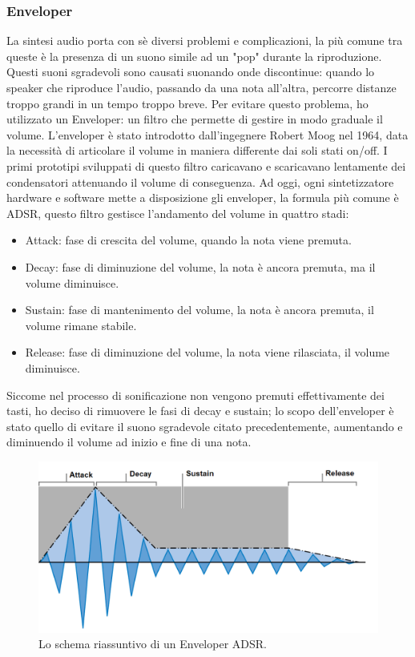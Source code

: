 \subsubsection{Enveloper}
La sintesi audio porta con sè diversi problemi e complicazioni, la più comune tra queste è la presenza di un suono simile ad un "pop" durante la riproduzione.
Questi suoni sgradevoli sono causati suonando onde discontinue: quando lo speaker che riproduce l'audio, passando da una nota all'altra, percorre distanze troppo grandi in un tempo troppo breve.
Per evitare questo problema, ho utilizzato un Enveloper: un filtro che permette di gestire in modo graduale il volume.
L'enveloper è stato introdotto dall'ingegnere Robert Moog nel 1964, data la necessità di articolare il volume in maniera differente dai soli stati on/off.
I primi prototipi sviluppati di questo filtro caricavano e scaricavano lentamente dei condensatori attenuando il volume di conseguenza.
Ad oggi, ogni sintetizzatore hardware e software mette a disposizione gli enveloper, la formula più comune è ADSR, questo filtro gestisce l'andamento del volume in quattro stadi:
\begin{itemize}
    \item Attack: fase di crescita del volume, quando la nota viene premuta.
    \item Decay: fase di diminuzione del volume, la nota è ancora premuta, ma il volume diminuisce.
    \item Sustain: fase di mantenimento del volume, la nota è ancora premuta, il volume rimane stabile.
    \item Release: fase di diminuzione del volume, la nota viene rilasciata, il volume diminuisce.  
\end{itemize}
Siccome nel processo di sonificazione non vengono premuti effettivamente dei tasti, ho deciso di rimuovere le fasi di decay e sustain;
lo scopo dell'enveloper è stato quello di evitare il suono sgradevole citato precedentemente, aumentando e diminuendo il volume ad inizio e fine di una nota.
\begin{figure}[H]
    \includegraphics[width=\linewidth,scale=0.2]{img/adsr.PNG}
    \caption{Lo schema riassuntivo di un Enveloper ADSR.}
    \label{fig:asdr}
\end{figure}

